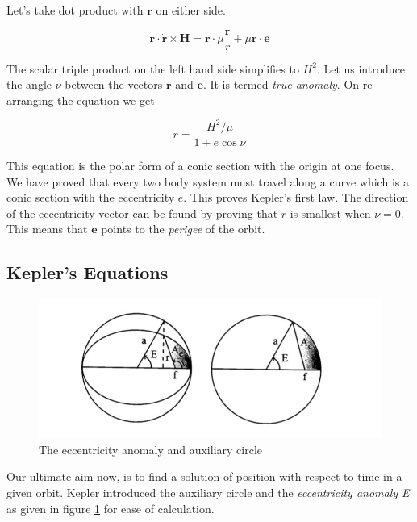 \documentclass{article}
\theoremstyle{definition}
\begin{document}
Let's take dot product with $\boldsymbol{r}$ on either side.

\begin{equation}
    \boldsymbol{r\cdot \Dot{r}\times H} = \boldsymbol{r}\cdot \mu \frac{\boldsymbol{r}}{r} + \mu\boldsymbol{r\cdot e}
\end{equation}

The scalar triple product on the left hand side simplifies to $H^2$. Let us introduce the angle $\nu$ between the vectors $\boldsymbol{r}$ and $\boldsymbol{e}$. It is termed \emph{true anomaly}. On re-arranging the equation we get

\begin{equation}\label{r_pol}
    r= \frac{H^2/\mu}{1 + e \cos\nu}
\end{equation}

This equation is the polar form of a conic section with the origin at one focus.
We have proved that every two body system must travel along a curve which is a conic section with the eccentricity $e$. This proves Kepler's first law. 
The direction of the eccentricity vector can be found by proving that $r$ is smallest when $\nu = 0$. This means that $\boldsymbol{e}$ points to the \emph{perigee} of the orbit.

\subsection{Kepler's Equations}

\begin{figure}[h]
    \centering
    \includegraphics[scale=0.3]{image 3.jpeg}
    \caption{The eccentricity anomaly and auxiliary circle}
    \label{fig: aux_cir}
\end{figure}



Our ultimate aim now, is to find a solution of position with respect to time in a given orbit. Kepler introduced the auxiliary circle and the \emph{eccentricity anomaly E} as given in figure \ref{fig: aux_cir} for ease of calculation. 
\end{document}
